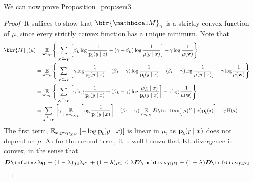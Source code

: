 We can now prove         Proposition~\ref{prop:sem3}.
\begin{proof}
It suffices to show that $\bbr{\dg
			  M}_\gamma$ is a strictly convex function of $\mu$,
since every strictly convex function has a unique minimum.
Note that
	\begin{align*}
		\bbr{M}_\gamma(\mu) 
			&= \E_{\mat w \sim \mu} \Bigg\{   \sum_{ X \xrightarrow{\!\!L} Y  } \left[
				\beta_L \log \frac{1}{\bp(y\mid x)} + (\gamma - \beta_L ) \log \frac{1}{\mu(y \mid x)} \right] - \gamma \log \frac{1}{\mu(\mat w)} \Bigg\} \\
			&= \E_{\mat w \sim \mu} \Bigg\{   \sum_{ X \xrightarrow{\!\!L} Y  } \left[ \gamma \log \frac{1}{\bp(y\mid x)} + 
				(\beta_L - \gamma) \log \frac{1}{\bp(y\mid x)} - (\beta_L -\gamma) \log \frac{1}{\mu(y \mid x)} \right] - \gamma \log \frac{1}{\mu(\mat w)} \Bigg\}  \\
			&= \E_{\mat w \sim \mu} \Bigg\{   \sum_{ X \xrightarrow{\!\!L} Y  } \left[ \gamma \log \frac{1}{\bp(y\mid x)} + 
				(\beta_L - \gamma) \log \frac{\mu(y\mid x)}{\bp(y\mid x)} \right] - \gamma \log \frac{1}{\mu(\mat w)} \Bigg\} \\
			&=  \sum_{ X \xrightarrow{\!\!L} Y  } \left[ \gamma \E_{x,y \sim \mu_{\!_{XY}}} \left[\log \frac{1}{\bp(y\mid x)} \right] + 
				(\beta_L - \gamma) \E_{x\sim\mu_X} \kldiv[\Big]{\mu(Y\mid x)}{\bp( x)} \right] - \gamma \H(\mu)
	\end{align*}
	The first term, 
	\( \operatorname*{\mathbb{E}}_{x,y \sim \mu_{\!_{XY}}} \left[-\log {\mathbf{p}_{\!_{L}\!}(y\mid x)}\right] \) 
	is linear in $\mu$, as $\mathbf{p}_{\!_{L}\!}(y\mid x)$ does not depend on $\mu$. %
As for the second term, it is well-known that KL divergence is convex, in the sense that 
	\[ \kldiv{\lambda q_1 + (1-\lambda) q_2 }{ \lambda p_1 + (1-\lambda) p_2} \leq \lambda \kldiv {q_1}{ p_1} + (1-\lambda) \kldiv{q_2}{p_2} \]

\end{proof}
